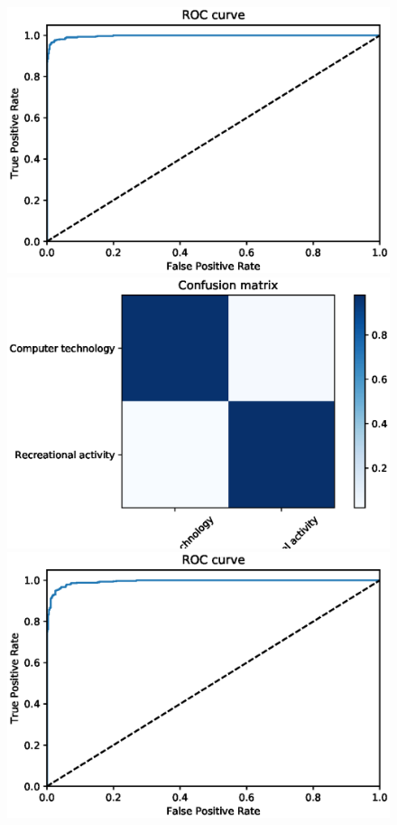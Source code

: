 \documentclass[letterpaper]{article}
\begin{document}
\begin{figure}[!htb]
\centering
\begin{minipage}{0.5\textwidth}
\includegraphics[width=1.0\textwidth]{roc-lsi-svm-train}
\end{minipage}%
\begin{minipage}{0.5\textwidth}
\includegraphics[width=1.0\textwidth]{conf-mat-lsi-svm-train}
\end{minipage}
\begin{minipage}{0.5\textwidth}
\includegraphics[width=1.0\textwidth]{roc-nmf-svm-train}

\end{minipage}
\end{figure}
\end{document}
